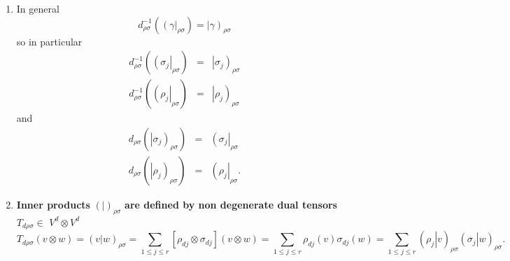 \documentclass[aps,preprint]{revtex4}
\newtheorem{definition}[theorem]{Definition}
\begin{document}
\begin{enumerate}
\begin{definition}
\begin{eqnarray}
\left( \sigma _{j}\right\vert _{\rho \sigma }\left( w\right) &=&\sigma
_{dj}\left( w\right) \quad \forall w\in V \\
\left( \rho _{j}\right\vert _{\rho \sigma }\left( v\right) &=&\rho
_{dj}\left( v\right) \quad \forall v\in V.
\end{eqnarray}
\end{definition}

\item In general%
\begin{equation}
d_{\rho \sigma }^{-1}\left( \left( \gamma \right\vert _{\rho \sigma }\right)
=\left\vert \gamma \right) _{\rho \sigma }
\end{equation}%
so in particular 
\begin{eqnarray}
d_{\rho \sigma }^{-1}\left( \left( \sigma _{j}\right\vert _{\rho \sigma
}\right) &=&\left\vert \sigma _{j}\right) _{\rho \sigma } \\
d_{\rho \sigma }^{-1}\left( \left( \rho _{j}\right\vert _{\rho \sigma
}\right) &=&\left\vert \rho _{j}\right) _{\rho \sigma }
\end{eqnarray}%
and 
\begin{eqnarray}
d_{\rho \sigma }\left( \left\vert \sigma _{j}\right) _{\rho \sigma }\right)
&=&\left( \sigma _{j}\right\vert _{\rho \sigma } \\
d_{\rho \sigma }\left( \left\vert \rho _{j}\right) _{\rho \sigma }\right)
&=&\left( \rho _{j}\right\vert _{\rho \sigma }.
\end{eqnarray}

\item \textbf{Inner products }$\left( \left. {}\right\vert \right) _{\rho
\sigma }$ \textbf{are defined by non degenerate dual tensors }$T_{d\rho
\sigma }\in $ $V^{d}\otimes V^{d}$ \label{Inner products are defined by dual
tensors} 
\begin{equation}
T_{d\rho \sigma }\left( v\otimes w\right) =\left( \left. v\right\vert
w\right) _{\rho \sigma }=\sum_{1\leq j\leq r}\left[ \rho _{dj}\otimes \sigma
_{dj}\right] \left( v\otimes w\right) =\sum_{1\leq j\leq r}\rho _{dj}\left(
v\right) \sigma _{dj}\left( w\right) =\sum_{1\leq j\leq r}\left( \left. \rho
_{j}\right\vert v\right) _{\rho \sigma }\left( \left. \sigma _{j}\right\vert
w\right) _{\rho \sigma }.
\end{equation}


\end{enumerate}
\end{document}
